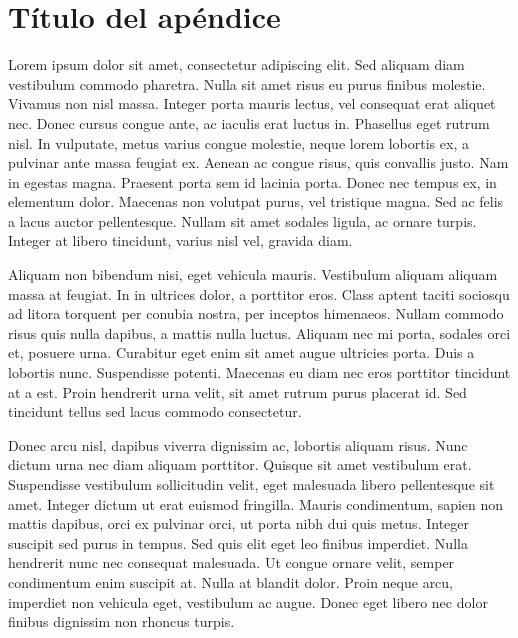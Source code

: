  
 \appendix
 
\chapter{Título del apéndice}\label{aped.A}

Lorem ipsum dolor sit amet, consectetur adipiscing elit. Sed aliquam diam vestibulum commodo pharetra. Nulla sit amet risus eu purus finibus molestie. Vivamus non nisl massa. Integer porta mauris lectus, vel consequat erat aliquet nec. Donec cursus congue ante, ac iaculis erat luctus in. Phasellus eget rutrum nisl. In vulputate, metus varius congue molestie, neque lorem lobortis ex, a pulvinar ante massa feugiat ex. Aenean ac congue risus, quis convallis justo. Nam in egestas magna. Praesent porta sem id lacinia porta. Donec nec tempus ex, in elementum dolor. Maecenas non volutpat purus, vel tristique magna. Sed ac felis a lacus auctor pellentesque. Nullam sit amet sodales ligula, ac ornare turpis. Integer at libero tincidunt, varius nisl vel, gravida diam.

Aliquam non bibendum nisi, eget vehicula mauris. Vestibulum aliquam aliquam massa at feugiat. In in ultrices dolor, a porttitor eros. Class aptent taciti sociosqu ad litora torquent per conubia nostra, per inceptos himenaeos. Nullam commodo risus quis nulla dapibus, a mattis nulla luctus. Aliquam nec mi porta, sodales orci et, posuere urna. Curabitur eget enim sit amet augue ultricies porta. Duis a lobortis nunc. Suspendisse potenti. Maecenas eu diam nec eros porttitor tincidunt at a est. Proin hendrerit urna velit, sit amet rutrum purus placerat id. Sed tincidunt tellus sed lacus commodo consectetur.

Donec arcu nisl, dapibus viverra dignissim ac, lobortis aliquam risus. Nunc dictum urna nec diam aliquam porttitor. Quisque sit amet vestibulum erat. Suspendisse vestibulum sollicitudin velit, eget malesuada libero pellentesque sit amet. Integer dictum ut erat euismod fringilla. Mauris condimentum, sapien non mattis dapibus, orci ex pulvinar orci, ut porta nibh dui quis metus. Integer suscipit sed purus in tempus. Sed quis elit eget leo finibus imperdiet. Nulla hendrerit nunc nec consequat malesuada. Ut congue ornare velit, semper condimentum enim suscipit at. Nulla at blandit dolor. Proin neque arcu, imperdiet non vehicula eget, vestibulum ac augue. Donec eget libero nec dolor finibus dignissim non rhoncus turpis.

